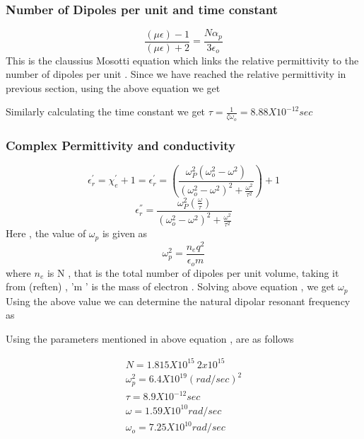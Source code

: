 \documentclass[journal]{IEEEtran}
\begin{document}
\subsubsection{Number of Dipoles per unit and time constant }
\begin{equation} \label{ten}
\dfrac{({\mu \epsilon})- 1}{({\mu \epsilon}) + 2 } = \dfrac{N \alpha_p}{3 \epsilon_o}
\end{equation}
This is the claussius Mosotti  equation which links the relative permittivity to the number of dipoles per unit . Since we have reached the relative permittivity in previous section, using the above equation we get 


Similarly calculating the time constant we get
$ \tau= \frac{1}{\zeta \omega_o} = 8.88 X 10 ^{-12} sec$

\subsubsection{Complex Permittivity and conductivity}
\begin{equation}
\epsilon^{'}_{r } = \chi^{'}_{e} + 1 =
\epsilon^{'}_r = (\dfrac{\omega^2_P (\omega^2_o - \omega^2)}{(\omega^2_o - \omega^2)^2 + \frac{\omega^2}{\tau^2}}) + 1
\end{equation}
\begin{equation}
\epsilon^{''}_{r } = \dfrac{\omega^2_P (\frac{\omega}{\tau})}{(\omega^2_o - \omega^2)^2 + \frac{\omega^2}{\tau^2}}
\end{equation}
Here , the value of $\omega_p $ is given as
\begin{equation}
\omega^2_p = \dfrac{n_e q^2}{\epsilon_o m}
\end{equation}
where $n_e$ is N , that is the total number of dipoles per unit volume, taking it from (ref{ten}) , 'm ' is the mass of electron . Solving above equation , we get $\omega_p$
Using the above value we can determine the natural dipolar resonant frequency as

Using the parameters mentioned in above equation , are as follows

\begin{align*}
N = 1.815 X 10^{15}  ~ 2 x 10^{15} \\
\omega^2_p = 6.4 X 10^{19} (rad/sec)^2 \\
\tau = 8.9 X 10^{-12} sec\\
\omega = 1.59 X 10^{10} rad/sec\\
\omega_o = 7.25 X 10^{10} rad/sec\\
\end{align*}
\end{document}

